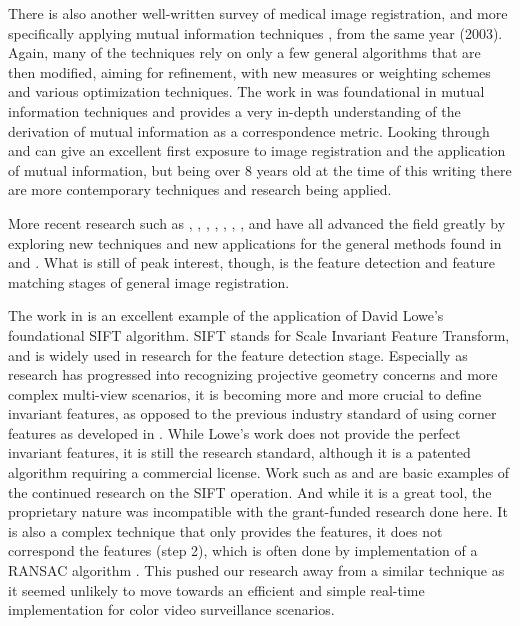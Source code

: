  There is also another well-written survey of medical image registration, and more specifically applying mutual information techniques \cite{Pluim2003}, from the same year (2003). Again, many of the techniques rely on only a few general algorithms that are then modified, aiming for refinement, with new measures or weighting schemes and various optimization techniques. The work in \cite{Viola1997} was foundational in mutual information techniques and provides a very in-depth understanding of the derivation of mutual information as a correspondence metric. Looking through \cite{Zitova2003} and \cite{Pluim2003} can give an excellent first exposure to image registration and the application of mutual information, but being over 8 years old at the time of this writing there are more contemporary techniques and research being applied.
 
 More recent research such as \cite{Walli2009}, \cite{Rav-Acha2005}, \cite{Nilosek2009}, \cite{Kanazawa2004}, \cite{Haenselmann2009}, \cite{Gracias2009}, \cite{Brown2007}, and \cite{Fan2008} have all advanced the field greatly by exploring new techniques and new applications for the general methods found in \cite{Zitova2003} and \cite{Pluim2003}. What is still of peak interest, though, is the feature detection and feature matching stages of general image registration.
 
  The work in \cite{Brown2003} is an excellent example of the application of David Lowe's foundational SIFT algorithm. SIFT stands for Scale Invariant Feature Transform, and is widely used in research for the feature detection stage. Especially as research has progressed into recognizing projective geometry concerns and more complex multi-view scenarios, it is becoming more and more crucial to define invariant features, as opposed to the previous industry standard of using corner features as developed in \cite{Harris1988}. While Lowe's work does not provide the perfect invariant features, it is still the research standard, although it is a patented algorithm requiring a commercial license. Work such as \cite{Kanazawa2004} and \cite{Brown2007} are basic examples of the continued research on the SIFT operation. And while it is a great tool, the proprietary nature was incompatible with the grant-funded research done here. It is also a complex technique that only provides the features, it does not correspond the features (step 2), which is often done by implementation of a RANSAC algorithm \cite{Brown2007}. This pushed our research away from a similar technique as it seemed unlikely to move towards an efficient and simple real-time implementation for color video surveillance scenarios.
  
